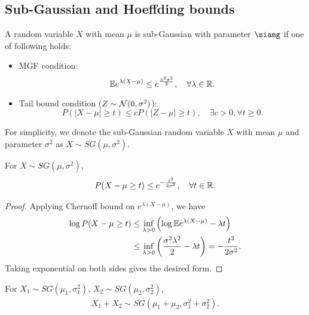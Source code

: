 \subsection{Sub-Gaussian and Hoeffding bounds}
\begin{definition} A random variable $X$ with mean $\mu$ is sub-Gaussian with parameter $\siamg$ if one of following holds:
\begin{itemize}
    \item MGF condition: $$\mathbb{E}{e^{\lambda (X - \mu)} \leq e^{\frac{\lambda^2 \sigma^2 }{2}}}, \quad \forall \lambda \in \mathbb{R}.$$
    \item Tail bound condition ($Z \sim \mathcal{N}(0, \sigma^2)$): $$P(|X - \mu| \geq t) \leq c P(|Z - \mu| \geq t), \quad \exists c > 0, \forall t \geq 0.$$
\end{itemize}
\end{definition}
\noindent For simplicity, we denote the sub-Gaussian random variable $X$ with mean $\mu$ and parameter $\sigma^2$ as $X \sim SG(\mu, \sigma^2)$.

\begin{property} For $X \sim SG(\mu, \sigma^2)$,
\begin{align*}
    P(X - \mu \geq t) \leq e^{-\frac{t^2}{2\sigma^2}}, \quad \forall t \in \mathbb{R}.
\end{align*}
\end{property}
\begin{proof}
Applying Chernoff bound on $e^{\lambda(X - \mu)}$, we have
\begin{align*}
    \log  P(X - \mu \geq t) & \leq \inf_{\lambda > 0} \left( \log \mathbb{E}{e^{\lambda(X - \mu)}} - \lambda t \right) \\
    & \leq  \inf_{\lambda > 0} \left(\frac{\sigma^2 \lambda^2}{2}- \lambda t \right) = -\frac{t^2}{2 \sigma^2}.
\end{align*}
Taking exponential on both sides gives the desired form.
\end{proof}

\begin{property} For $X_1 \sim SG(\mu_1, \sigma_1^2)$, $X_2 \sim SG(\mu_2, \sigma_2^2)$, 
\begin{align*}
    X_1 + X_2 \sim SG(\mu_1 + \mu_2, \sigma_1^2 + \sigma_2^2).
\end{align*}
\end{property}

